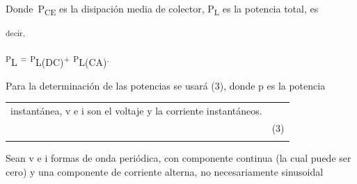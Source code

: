 \documentclass[12pt]{article}
\begin{document}

\begin{adjustwidth}{1.07in}{0.0in}
{\fontsize{9pt}{10.8pt}\selectfont Donde\  P\textsubscript{CE} es la disipación media de colector, P\textsubscript{L} es la potencia total, es\par}\par

\end{adjustwidth}

\begin{adjustwidth}{0.86in}{0.0in}
\textsuperscript{decir,}{\fontsize{6pt}{7.2pt}\selectfont  \textsuperscript{P}L \textsuperscript{=} \textsuperscript{P}L(DC)\textsuperscript{+} \textsuperscript{P}L(CA)\textsuperscript{.}\par}\par

\end{adjustwidth}

\begin{adjustwidth}{1.07in}{0.0in}
{\fontsize{9pt}{10.8pt}\selectfont Para la determinación de las potencias se usará (3), donde p es la potencia\par}\par

\end{adjustwidth}


\vspace{\baselineskip}




\begin{table}[H]
 			\centering
\begin{tabular}{p{3.88in}p{0.48in}}
\multicolumn{1}{p{3.88in}}{instantánea, v e i son el voltaje y la corriente instantáneos.} & 
\multicolumn{1}{p{0.48in}}{} \\
\hhline{~~}
\multicolumn{1}{p{3.88in}}{p = vi} & 
\multicolumn{1}{p{0.48in}}{(3)} \\
\hhline{~~}

\end{tabular}
 \end{table}




\vspace{\baselineskip}
\begin{adjustwidth}{0.86in}{0.88in}
\begin{justify}
{\fontsize{9pt}{10.8pt}\selectfont Sean v e i formas de onda periódica, con componente continua (la cual puede ser cero) y una componente de corriente alterna, no necesariamente sinusoidal\par}
\end{justify}\par

\end{adjustwidth}
\end{document}

